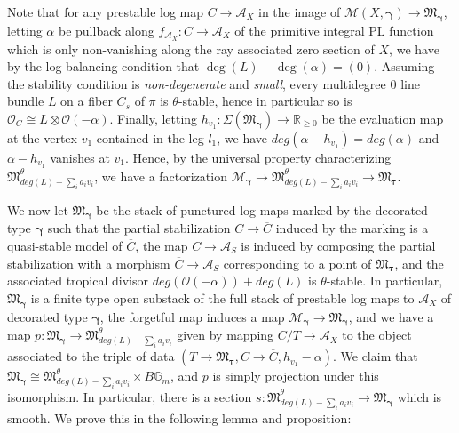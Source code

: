 \documentclass[12pt, oneside]{amsart}   	%
\numberwithin{equation}{section}
\numberwithin{thm}{section}
\numberwithin{figure}{section}
\begin{document}
Note that for any prestable log map $C \rightarrow \mathcal{A}_X$ in the image of $\mathscr{M}(X,\pmb\gamma) \rightarrow \mathfrak{M}_{\pmb\gamma}$, letting $\alpha$ be pullback along $f_{\mathcal{A}_X}: C \rightarrow \mathcal{A}_X$ of the primitive integral PL function which is only non-vanishing along the ray associated zero section of $X$, we have by the log balancing condition that $\deg(L) - \deg(\alpha) = (0)$. Assuming the stability condition is \emph{non-degenerate} and \emph{small}, every multidegree $0$ line bundle $L$ on a fiber $C_s$ of $\pi$ is $\theta$-stable, hence in particular so is $\mathcal{O}_C \cong L\otimes\mathcal{O}(-\alpha)$. Finally, letting $h_{v_1}: \Sigma(\mathfrak{M}_{\pmb\gamma}) \rightarrow \mathbb{R}_{\ge 0}$ be the evaluation map at the vertex $v_1$ contained in the leg $l_1$, we have $deg(\alpha - h_{v_1}) = deg(\alpha)$ and $\alpha - h_{v_1}$ vanishes at $v_1$. Hence, by the universal property characterizing $\mathfrak{M}^\theta_{deg(L) - \sum_i a_iv_i}$, we have a factorization $\mathscr{M}_{\pmb\gamma} \rightarrow \mathfrak{M}^\theta_{deg(L) -\sum_i a_iv_i} \rightarrow \mathfrak{M}_{\pmb\tau}$. 

We now let $\mathfrak{M}_{\pmb\gamma}$ be the stack of punctured log maps marked by the decorated type $\pmb\gamma$ such that the partial stabilization $C \rightarrow \overline{C}$ induced by the marking is a quasi-stable model of $\overline{C}$, the map $C \rightarrow \mathcal{A}_S$ is induced by composing the partial stabilization with a morphism $\overline{C} \rightarrow \mathcal{A}_S$ corresponding to a point of $\mathfrak{M}_{\pmb\tau}$, and the associated tropical divisor $deg(\mathcal{O}(-\alpha)) + deg(L)$ is $\theta$-stable. In particular, $\mathfrak{M}_{\pmb\gamma}$ is a finite type open substack of the full stack of prestable log maps to $\mathcal{A}_X$ of decorated type $\pmb\gamma$, the forgetful map induces a map $\mathscr{M}_{\pmb\gamma}\rightarrow \mathfrak{M}_{\pmb\gamma}$, and we have a map $p: \mathfrak{M}_{\pmb\gamma} \rightarrow \mathfrak{M}^\theta_{deg(L) - \sum_i a_iv_i}$ given by mapping $C/T \rightarrow \mathcal{A}_X$ to the object associated to the triple of data $(T \rightarrow \mathfrak{M}_{\pmb\tau}, C \rightarrow \overline{C},h_{v_1}-\alpha)$. We claim that $\mathfrak{M}_{\pmb\gamma} \cong \mathfrak{M}^\theta_{deg(L) - \sum_i a_iv_i} \times B\mathbb{G}_m$, and $p$ is simply projection under this isomorphism. In particular, there is a section  $s: \mathfrak{M}^\theta_{deg(L) - \sum_i a_iv_i} \rightarrow \mathfrak{M}_{\pmb\gamma}$ which is smooth. We prove this in the following lemma and proposition:
\end{document}
